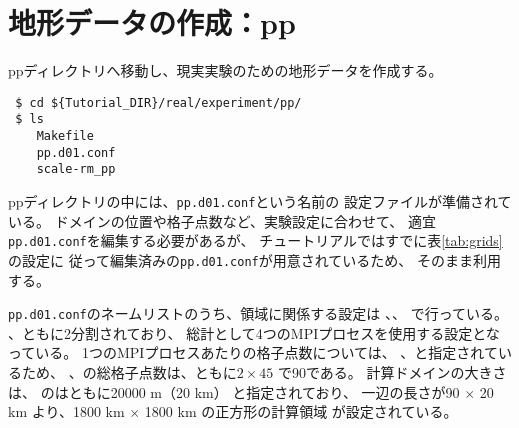 \section{地形データの作成：pp} \label{sec:tutrial_real_pp}

ppディレクトリへ移動し、現実実験のための地形データを作成する。
\begin{verbatim}
 $ cd ${Tutorial_DIR}/real/experiment/pp/
 $ ls
    Makefile
    pp.d01.conf
    scale-rm_pp
\end{verbatim}
ppディレクトリの中には、\verb|pp.d01.conf|という名前の
設定ファイルが準備されている。
ドメインの位置や格子点数など、実験設定に合わせて、
適宜\verb|pp.d01.conf|を編集する必要があるが、
チュートリアルではすでに表\ref{tab:grids}の設定に
従って編集済みの\verb|pp.d01.conf|が用意されているため、
そのまま利用する。

\verb|pp.d01.conf|のネームリストのうち、領域に関係する設定は
、、
で行っている。
{\XDIR} 、{\YDIR}ともに2分割されており、
総計として4つのMPIプロセスを使用する設定となっている。
1つのMPIプロセスあたりの格子点数については、
、と指定されているため、
{\XDIR} 、{\YDIR}の総格子点数は、ともに$2 \times 45$ で90である。
計算ドメインの大きさは、
のはともに20000 m（20 km）
と指定されており、
一辺の長さが90 $\times$ 20 km より、1800 km $\times$ 1800 km の正方形の計算領域
が設定されている。\\

